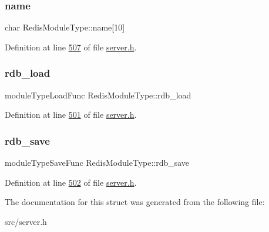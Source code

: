 \subsubsection{\texorpdfstring{name}{name}}
{\footnotesize\ttfamily char Redis\+Module\+Type\+::name\mbox{[}10\mbox{]}}



Definition at line \hyperlink{server_8h_source_l00507}{507} of file \hyperlink{server_8h_source}{server.\+h}.

\mbox{\label{structRedisModuleType_a2c0e490af26287ef2840a9b5d81b5d27}} 
\subsubsection{\texorpdfstring{rdb\+\_\+load}{rdb\_load}}
{\footnotesize\ttfamily module\+Type\+Load\+Func Redis\+Module\+Type\+::rdb\+\_\+load}



Definition at line \hyperlink{server_8h_source_l00501}{501} of file \hyperlink{server_8h_source}{server.\+h}.

\mbox{\label{structRedisModuleType_acc8570eb2af9c01afbdef0dadb889559}} 
\subsubsection{\texorpdfstring{rdb\+\_\+save}{rdb\_save}}
{\footnotesize\ttfamily module\+Type\+Save\+Func Redis\+Module\+Type\+::rdb\+\_\+save}



Definition at line \hyperlink{server_8h_source_l00502}{502} of file \hyperlink{server_8h_source}{server.\+h}.



The documentation for this struct was generated from the following file\+:\begin{DoxyCompactItemize}
\item 
src/server.\+h\end{DoxyCompactItemize}
